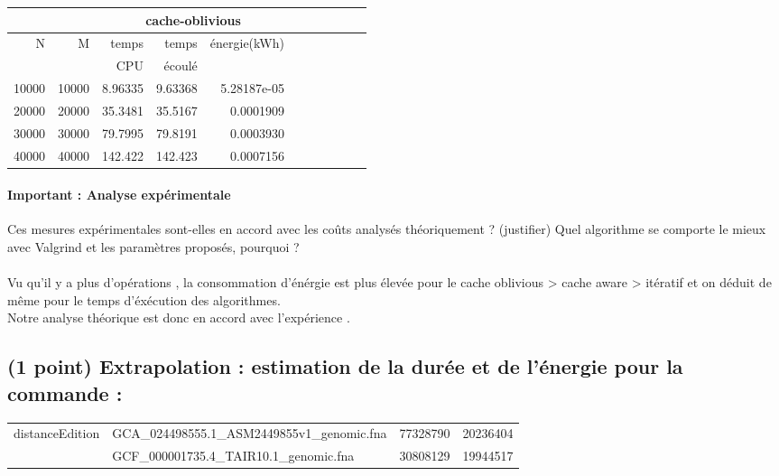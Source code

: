 \documentclass[10pt,a4paper]{article}
\begin{document}
\begin{tabular}{|r|r||r|r|r||r|r|r||r|r|r||}
  \hline
   \multicolumn{2}{|c||}{ } 
   & \multicolumn{3}{c||}{cache-oblivious}
   \\ \hline
N & M 

& temps   & temps & énergie(kWh)       %
\\
& 

& CPU     & écoulé&               %
\\ \hline
\hline
10000 & 10000 

& 8.96335 & 9.63368  & 5.28187e-05  %
\\ \hline
20000 & 20000 

& 35.3481 & 35.5167 & 0.0001909  %
\\ \hline
30000 & 30000 

& 79.7995 & 79.8191 & 0.0003930  %
\\ \hline
40000 & 40000 

& 142.422 & 142.423 & 0.0007156  %
\\ \hline
\hline
\end{tabular}

\paragraph{Important : Analyse expérimentale}
Ces mesures expérimentales sont-elles en accord avec les coûts analysés théoriquement ? (justifier)
Quel algorithme se comporte le mieux avec Valgrind et les paramètres proposés, pourquoi ?\\
\\ Vu qu'il y a plus d'opérations , la consommation d'énérgie est plus élevée pour le cache oblivious > cache aware > itératif et on déduit de même pour le temps 
d'éxécution des algorithmes. \\ 
Notre analyse théorique est donc en accord avec l'expérience .\\ 

\subsection{(1 point) Extrapolation : estimation de la durée et de l'énergie pour la commande :}
\begin{tabular}{llll}
    distanceEdition & GCA\_024498555.1\_ASM2449855v1\_genomic.fna & 77328790 & 20236404 \\
    & GCF\_000001735.4\_TAIR10.1\_genomic.fna & 30808129 & 19944517
\end{tabular}
\end{document}
